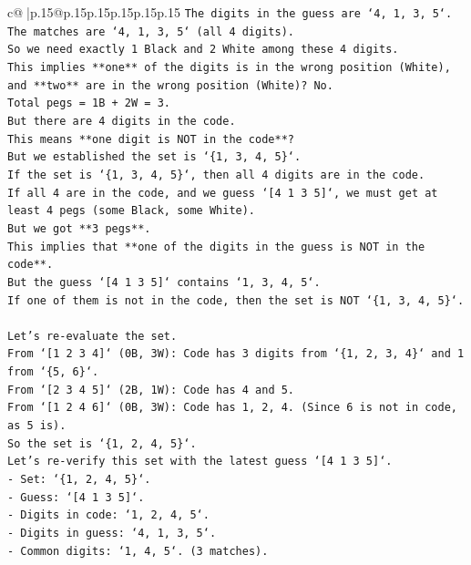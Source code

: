 \documentclass{article}
\begin{document}
{\begin{supertabular}{c@{$\;$}|p{.15\linewidth}@{}p{.15\linewidth}p{.15\linewidth}p{.15\linewidth}p{.15\linewidth}p{.15\linewidth}}
{{{\texttt{The digits in the guess are `4, 1, 3, 5`.} \\
\texttt{The matches are `4, 1, 3, 5` (all 4 digits).} \\
\texttt{So we need exactly 1 Black and 2 White among these 4 digits.} \\
\texttt{This implies **one** of the digits is in the wrong position (White), and **two** are in the wrong position (White)? No.} \\
\texttt{Total pegs = 1B + 2W = 3.} \\
\texttt{But there are 4 digits in the code.} \\
\texttt{This means **one digit is NOT in the code**?} \\
\texttt{But we established the set is `\{1, 3, 4, 5\}`.} \\
\texttt{If the set is `\{1, 3, 4, 5\}`, then all 4 digits are in the code.} \\
\texttt{If all 4 are in the code, and we guess `{[}4 1 3 5{]}`, we must get at least 4 pegs (some Black, some White).} \\
\texttt{But we got **3 pegs**.} \\
\texttt{This implies that **one of the digits in the guess is NOT in the code**.} \\
\texttt{But the guess `{[}4 1 3 5{]}` contains `1, 3, 4, 5`.} \\
\texttt{If one of them is not in the code, then the set is NOT `\{1, 3, 4, 5\}`.} \\
\\ 
\texttt{Let's re{-}evaluate the set.} \\
\texttt{From `{[}1 2 3 4{]}` (0B, 3W): Code has 3 digits from `\{1, 2, 3, 4\}` and 1 from `\{5, 6\}`.} \\
\texttt{From `{[}2 3 4 5{]}` (2B, 1W): Code has 4 and 5.} \\
\texttt{From `{[}1 2 4 6{]}` (0B, 3W): Code has 1, 2, 4. (Since 6 is not in code, as 5 is).} \\
\texttt{So the set is `\{1, 2, 4, 5\}`.} \\
\texttt{Let's re{-}verify this set with the latest guess `{[}4 1 3 5{]}`.} \\
\texttt{{-} Set: `\{1, 2, 4, 5\}`.} \\
\texttt{{-} Guess: `{[}4 1 3 5{]}`.} \\
\texttt{{-} Digits in code: `1, 2, 4, 5`.} \\
\texttt{{-} Digits in guess: `4, 1, 3, 5`.} \\
\texttt{{-} Common digits: `1, 4, 5`. (3 matches).} \\
}}}
\end{supertabular}}
\end{document}
